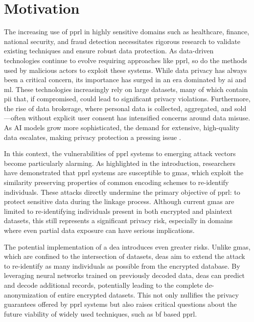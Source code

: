 \section{Motivation}  \label{sec:motivation}
The increasing use of \ac{pprl} in highly sensitive domains such as healthcare, finance, national security, and fraud detection necessitates rigorous research to validate existing techniques and ensure robust data protection. 
As data-driven technologies continue to evolve requiring approaches like \ac{pprl}, so do the methods used by malicious actors to exploit these systems.
While data privacy has always been a critical concern, its importance has surged in an era dominated by \ac{ai} and \ac{ml}. 
These technologies increasingly rely on large datasets, many of which contain \ac{pii} that, if compromised, could lead to significant privacy violations. 
Furthermore, the rise of data brokerage, where personal data is collected, aggregated, and sold—often without explicit user consent has intensified concerns around data misuse. 
As AI models grow more sophisticated, the demand for extensive, high-quality data escalates, making privacy protection a pressing issue \cite{ldc2024,cacgroup2024,arxiv2024}.

In this context, the vulnerabilities of \ac{pprl} systems to emerging attack vectors become particularly alarming. 
As highlighted in the introduction, researchers have demonstrated that \ac{pprl} systems are susceptible to \ac{gma}s, which exploit the similarity preserving properties of common encoding schemes to re-identify individuals. 
These attacks directly undermine the primary objective of \ac{pprl}: to protect sensitive data during the linkage process. 
Although current \ac{gma}s are limited to re-identifying individuals present in both encrypted and plaintext datasets, this still represents a significant privacy risk, especially in domains where even partial data exposure can have serious implications.

The potential implementation of a \ac{dea} introduces even greater risks. 
Unlike \ac{gma}s, which are confined to the intersection of datasets, \ac{dea}s aim to extend the attack to re-identify as many individuals as possible from the encrypted database. 
By leveraging neural networks trained on previously decoded data, \ac{dea}s can predict and decode additional records, potentially leading to the complete de-anonymization of entire encrypted datasets. 
This not only nullifies the privacy guarantees offered by \ac{pprl} systems but also raises critical questions about the future viability of widely used techniques, such as \ac{bf} based \ac{pprl}.

